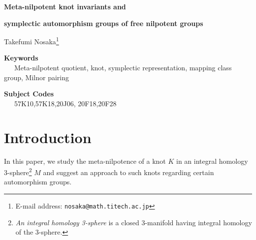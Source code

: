 \documentclass{article}
\theoremstyle{plain}
\theoremstyle{definition}
\begin{document}
\large
\begin{center}
{\bf\Large Meta-nilpotent knot invariants and}
\end{center}
\begin{center}
{\bf\Large symplectic automorphism groups of free nilpotent groups}
\end{center}
\begin{center}{Takefumi Nosaka\footnote{
E-mail address: {\tt nosaka@math.titech.ac.jp}
}}\end{center}
\begin{abstract}\baselineskip=12pt \noindent
We develop the nilpotent $p$-localization of knot groups in terms of the (symplectic) automorphism groups of free nilpotent groups.
We show that any map from the set of conjugacy classes of the outer automorphism groups defines a knot invariant.
Furthermore, we investigate these automorphism groups and compute the resulting knot invariants.
\end{abstract}
\begin{center}
\normalsize
\baselineskip=11pt
{\bf Keywords} \\
\ \ \ Meta-nilpotent quotient, knot, symplectic representation, mapping class group, Milnor pairing \ \ \
\end{center}
\begin{center}
\normalsize
\baselineskip=11pt
{\bf Subject Codes } \\
\ \ \ 57K10,57K18,20J06, 20F18,20F28 \ \ \
\end{center}




\large
\baselineskip=16pt
\section{Introduction}
In this paper, we study the meta-nilpotence of a knot $K$ in an integral homology 3-sphere\footnote{{\it An integral homology 3-sphere} is a closed 3-manifold having integral homology of the 3-sphere. } $M$ and suggest an approach to such knots regarding certain automorphism groups.
\end{document}
